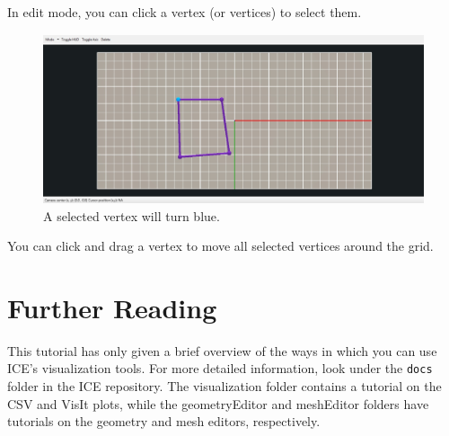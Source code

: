 In edit mode, you can click a vertex (or vertices) to select them. 

\begin{figure}[!h]
\includegraphics[width=12cm]{images/SelectedVertex}
\centering
\caption{A selected vertex will turn blue.}
\label{fig:selectedvertex}
\end{figure}

You can click and drag a vertex to move all selected vertices around the grid.

\section{Further Reading}

This tutorial has only given a brief overview of the ways in which you can use
ICE's visualization tools. For more detailed information, look under the
\texttt{docs} folder in the ICE repository. The visualization folder contains a
tutorial on the CSV and VisIt plots, while the geometryEditor and meshEditor
folders have tutorials on the geometry and mesh editors, respectively. 